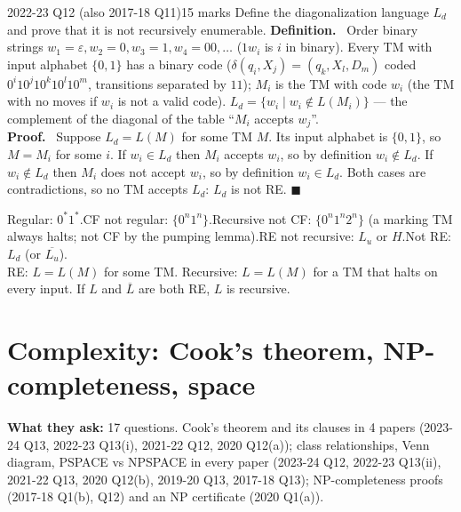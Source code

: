 \documentclass[10.5pt,a4paper]{article}
\newcommand{\asked}[1]{{\small\color{gray!60!black}\textbf{What they ask:} #1}\par}
\newcommand{\ansh}[1]{\textbf{\color{exborder}#1}\ }
\newcommand{\eps}{\varepsilon}
\begin{document}
\begin{examq}{2022-23 Q12 (also 2017-18 Q11)}{15 marks}
Define the diagonalization language $L_d$ and prove that it is not recursively enumerable.
\tcblower
\ansh{Definition.} Order binary strings $w_1=\eps,w_2=0,w_3=1,w_4=00,\dots$ ($1w_i$ is $i$ in binary). Every TM with input alphabet $\{0,1\}$ has a
binary code ($\delta(q_i,X_j)=(q_k,X_l,D_m)$ coded $0^i10^j10^k10^l10^m$, transitions separated by $11$); $M_i$ is the TM with code $w_i$ (the
TM with no moves if $w_i$ is not a valid code). $L_d=\{w_i\mid w_i\notin L(M_i)\}$ --- the complement of the diagonal of the table
``$M_i$ accepts $w_j$''.\\
\ansh{Proof.} Suppose $L_d=L(M)$ for some TM $M$. Its input alphabet is $\{0,1\}$, so $M=M_i$ for some $i$. If $w_i\in L_d$ then $M_i$
accepts $w_i$, so by definition $w_i\notin L_d$. If $w_i\notin L_d$ then $M_i$ does not accept $w_i$, so by definition $w_i\in L_d$.
Both cases are contradictions, so no TM accepts $L_d$: $L_d$ is not RE. $\blacksquare$
\end{examq}

\begin{recipe}
Regular: $0^*1^*$.\quad CF not regular: $\{0^n1^n\}$.\quad Recursive not CF: $\{0^n1^n2^n\}$ (a marking TM always halts; not CF by the
pumping lemma).\quad RE not recursive: $L_u$ or $H$.\quad Not RE: $L_d$ (or $\overline{L_u}$).\\
RE: $L=L(M)$ for some TM. Recursive: $L=L(M)$ for a TM that halts on every input. If $L$ and $\overline L$ are both RE, $L$ is recursive.
\end{recipe}

\section{Complexity: Cook's theorem, NP-completeness, space}
\asked{17 questions. Cook's theorem and its clauses in 4 papers (2023-24 Q13, 2022-23 Q13(i), 2021-22 Q12, 2020 Q12(a)); class relationships,
Venn diagram, PSPACE vs NPSPACE in every paper (2023-24 Q12, 2022-23 Q13(ii), 2021-22 Q13, 2020 Q12(b), 2019-20 Q13, 2017-18 Q13);
NP-completeness proofs (2017-18 Q1(b), Q12) and an NP certificate (2020 Q1(a)).}
\end{document}
